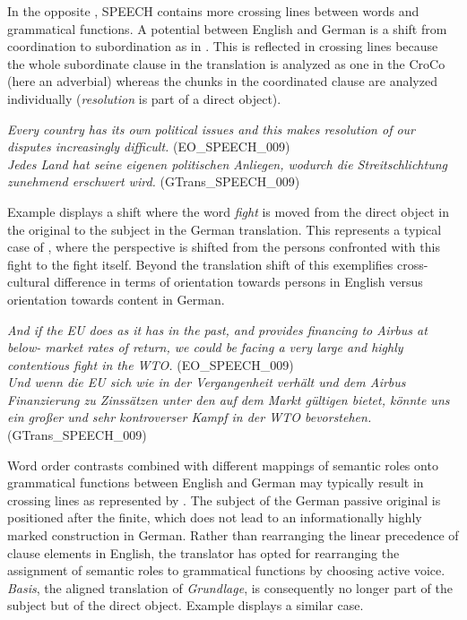 \documentclass[output=paper]{LSP/langsci}
\begin{document}
In the opposite , SPEECH contains more crossing lines between words and grammatical functions. A potential  between English and German is a shift from coordination to subordination as in . This is reflected in crossing lines because the whole subordinate clause in the translation is analyzed as one  in the CroCo  (here an adverbial) whereas the chunks in the coordinated clause are analyzed individually (\textit{resolution} is part of a direct object). 


\ea \label{ex:culo:27}
     \ea \textit{Every country has its own political issues and this makes resolution of our disputes increasingly difficult.} (EO\_SPEECH\_009)\\
      \ex \textit{Jedes Land hat seine eigenen politischen Anliegen, wodurch die Streitschlichtung zunehmend erschwert wird.} (GTrans\_SPEECH\_009) 
      \z
\z

Example  displays a shift where the word \textit{fight} is moved from the direct object in the original to the subject in the German translation. This represents a typical case of , where the perspective is shifted from the persons confronted with this fight to the fight itself. Beyond the translation shift of  this exemplifies  cross-cultural difference in terms of orientation towards persons in English versus orientation towards content in German. 

\ea \label{ex:culo:28}
   \ea \textit{And if the EU does as it has in the past, and provides financing to Airbus at below-  market rates of return, we could be facing a very large and highly contentious fight in the WTO.} (EO\_SPEECH\_009)\\
    \ex \textit{Und wenn die EU sich wie in der Vergangenheit verhält und dem Airbus Finanzierung zu Zinssätzen unter den auf dem Markt gültigen bietet, könnte uns ein großer und sehr kontroverser Kampf in der WTO bevorstehen.} (GTrans\_SPEECH\_009) 
    \z
\z

Word order contrasts combined with different mappings of semantic roles onto grammatical functions between English and German may typically result in crossing lines as represented by . The subject of the German passive original is positioned after the finite, which does not lead to an informationally highly marked construction in German. Rather than rearranging the linear precedence of clause elements in English, the translator has opted for rearranging the assignment of semantic roles to grammatical functions by choosing active voice. \textit{Basis}, the aligned translation of \textit{Grundlage}, is consequently no longer part of the subject but of the direct object. Example  displays a similar case. 
\end{document}
